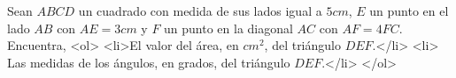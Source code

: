 Sean $ABCD$ un cuadrado con medida de sus lados igual a $5cm$, $E$ un punto en el lado $AB$ con $AE = 3 cm$ y $F$ un punto en la diagonal $AC$ con $AF = 4FC$. Encuentra,
<ol>
<li>El valor del área, en $cm^2$, del triángulo $DEF$.</li>
<li> Las medidas de los ángulos, en grados, del triángulo $DEF$.</li>
</ol>
